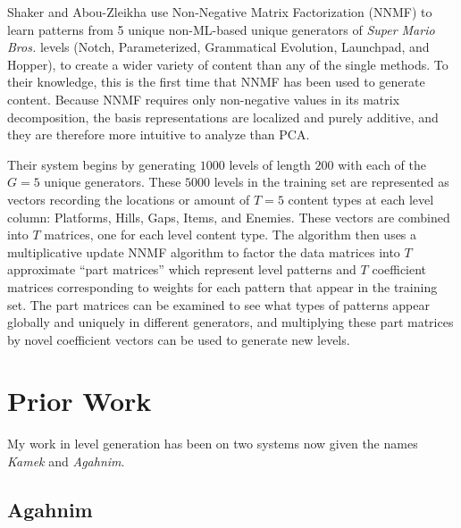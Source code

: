 \documentclass[12pt]{report}
\begin{document}
 Shaker and Abou-Zleikha \cite{shaker2014alone} use Non-Negative Matrix Factorization (NNMF) to learn patterns from 5 unique non-ML-based unique generators of \textit{Super Mario Bros.} levels (Notch, Parameterized, Grammatical Evolution, Launchpad, and Hopper), to create a wider variety of content than any of the single methods.  To their knowledge, this is the first time that NNMF has been used to generate content.  Because NNMF requires only non-negative values in its matrix decomposition, the basis representations are localized and purely additive, and they are therefore more intuitive to analyze than PCA.

Their system begins by generating $1000$ levels of length $200$ with each of the $G=5$ unique generators. These $5000$ levels in the training set are represented as vectors recording the locations or amount of $T=5$ content types at each level column: Platforms, Hills, Gaps, Items, and Enemies. These vectors are combined into $T$ matrices, one for each level content type.  The algorithm then uses a multiplicative update NNMF algorithm \cite{lee1999learning} to factor the data matrices into $T$ approximate ``part matrices'' which represent level patterns and $T$ coefficient matrices corresponding to weights for each pattern that appear in the training set.  The part matrices can be examined to see what types of patterns appear globally and uniquely in different generators, and multiplying these part matrices by novel coefficient vectors can be used to generate new levels. 

\section*{Prior Work}

My work in level generation has been on two systems now given the names \textit{Kamek} and \textit{Agahnim}.

\subsection*{Agahnim}
\end{document}
